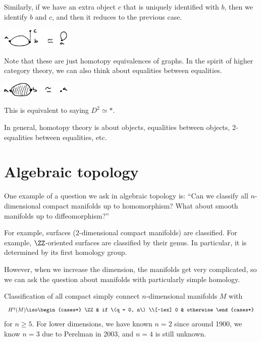 \documentclass{standalone}
\begin{document}
Similarly, if we have an extra object
  \(c\) that is uniquely identified with \(b\),
  then we identify \(b\) and \(c\),
  and then it reduces to the previous case.
\begin{center}
  \includegraphics[width=0.25\textwidth]{18_905-201207-3.png}
\end{center}

Note that these are just homotopy equivalences of graphs.
In the spirit of higher category theory,
we can also think about equalities between equalities.
\begin{center}
  \includegraphics[width=0.25\textwidth]{18_905-201207-4.png}
\end{center}
This is equivalent to saying \(D^2 \simeq *\).

In general, homotopy theory is about objects, equalities between objects,
\(2\)-equalities between equalities, etc.


\section{Algebraic topology}
One example of a question we ask in algebraic topology is:
``Can we classify all \(n\)-dimensional compact manifolds up to homomorphism?
  What about smooth manifolds up to diffeomorphism?''

For example, surfaces (\(2\)-dimensional compact manifolds) are classified.
For example, \(\ZZ\)-oriented surfaces are classified by their genus.
In particular, it is determined by its first homology group.

However, when we increase the dimension, the manifolds get very complicated,
so we can ask the question about manifolds with particularly simple homology.
\begin{theorem}
  Classification of all compact simply connect \(n\)-dimensional
  manifolds \(M\) with
  \[
    H^q(M) \iso \begin{cases*}
      \ZZ & if \(q = 0, n\) \\[-1ex]
      0 & otherwise
    \end{cases*}
  \]
  for \(n \geq 5\).
  For lower dimensions, we have known \(n = 2\) since around 1900,
  we know \(n = 3\) due to Perelman in 2003, and \(n = 4\) is still unknown.
\end{theorem}
\end{document}
